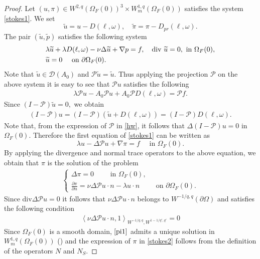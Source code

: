 \documentclass[12pt,a4paper,reqno]{amsart}
\theoremstyle{definition}
\theoremstyle{remark}
\numberwithin{equation}{section}
\newcommand{\ofo}{\Omega_{F}(0)}
\newcommand{\ds}{\displaystyle}
\newcommand{\mpp}{\mathcal{P}}
\begin{document}
\begin{proof}
Let $(u,\pi) \in W^{2,q}(\ofo)^{3} \times W^{1,q}_{m}(\ofo)$ satisfies the system \eqref{stokes1}. We set
\begin{equation*}
\widetilde u  = u - D(\ell, \omega), \quad \widetilde \pi = \pi - D_{pr}(\ell, \omega).
\end{equation*}
The pair $(\widetilde u, \widetilde p)$ satisfies the following system
\begin{align*}
&\lambda \widetilde u + \lambda D(\ell, \omega) - \nu \Delta \widetilde u + \nabla p = f, \quad \mathrm{ div} \ \widetilde u = 0, \mbox{ in } \ofo, \notag \\
&\widetilde u  = 0 \quad   \mbox{ on } \partial\ofo.
\end{align*}
Note that $\widetilde u \in \mathcal{D}(A_{0})$ and $\mpp \widetilde u = \widetilde u.$  Thus applying the projection $\mpp$ on the above system it is easy to see that $\mpp  u$ satisfies the following
\begin{align*}
\lambda \mpp u   - A_{0} \mpp u  + A_{0} \mpp D(\ell,\omega) = \mpp f.
\end{align*}
Since $(I - \mpp) \widetilde u = 0,$ we obtain
\begin{align*}
(I - \mpp) u = (I -\mpp)(\widetilde u + D(\ell, \omega)) = (I - \mpp) D (\ell,\omega ).
\end{align*}
Note that, from the expression of $\mpp$ in \cref{hw}, it follows that $\Delta(I - \mpp) u = 0$ in $\ofo.$ Therefore  the first equation of \eqref{stokes1} can be written as 
\begin{equation*}
\lambda u - \Delta \mpp u + \nabla \pi = f  \quad \mbox{ in } \ofo.
\end{equation*}
By applying the divergence and normal trace operators to the above equation, we obtain that $\pi$ is the solution of the problem
\begin{align} \label{pi1}
\begin{cases}
\Delta \pi =0  \qquad \mbox{ in } \ofo,   \\
\ds \frac{\partial \pi}{\partial n} =  \nu \Delta \mpp u \cdot n - \lambda u \cdot n \qquad \mbox{ on } \partial \ofo.
\end{cases}
\end{align}
Since $\mathrm{div} \Delta \mpp u = 0$ it follows that $\nu \Delta \mpp u \cdot n$  belongs to $W^{-1/q,q}(\partial\Omega)$  and satisfies the following condition
\begin{align*}
\left\langle \nu \Delta \mpp u \cdot n , 1 \right\rangle_{W^{-1/q,q}, W^{1-1/q',q'}}  = 0
\end{align*}
Since $\ofo$ is a smooth domain, $\eqref{pi1}$ admits a unique solution in $W^{1,q}_{m}(\ofo)$ (\cite[Theorem 9.2]{Fab98}) and the expression of $\pi$ in \eqref{stokes2} follows from the definition of the operators $N$ and $N_{S}.$


\end{proof}
\end{document}
